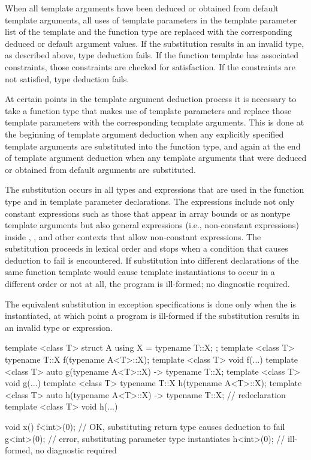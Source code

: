 When all template arguments have been deduced or obtained from
default template arguments, all uses of template parameters in
the template parameter list of the template and the function type
are replaced with the corresponding deduced
or default argument values. If the substitution results in an
invalid type, as described above, type deduction fails.
If the function template has associated constraints,
those constraints are checked for satisfaction.
If the constraints are not satisfied, type deduction fails.

\pnum
At certain points in the template argument deduction process it is necessary
to take a function type that makes use of template parameters and replace those
template parameters with the corresponding template arguments. This is done at
the beginning of template argument deduction when any explicitly specified
template arguments are substituted into the function type, and again at the end
of template argument deduction when any template arguments that were deduced or
obtained from default arguments are substituted.

\pnum
The substitution occurs in all types and expressions that are used in the function
type and in template parameter declarations. The expressions include not only
constant expressions such as those that appear in array bounds or as nontype
template arguments but also general expressions (i.e., non-constant expressions)
inside , , and other contexts that allow non-constant
expressions. The substitution proceeds in lexical order and stops when
a condition that causes deduction to fail is encountered.
If substitution into different declarations of the same function template would
cause template instantiations to occur in a different order or not at all,
the program is ill-formed; no diagnostic required.
\begin{note}
The equivalent substitution in exception specifications is
done only when the  is instantiated,
at which point a program is ill-formed
if the substitution results in an invalid type or expression.
\end{note}
\begin{example}
\begin{codeblock}
template <class T> struct A { using X = typename T::X; };
template <class T> typename T::X f(typename A<T>::X);
template <class T> void f(...) { }
template <class T> auto g(typename A<T>::X) -> typename T::X;
template <class T> void g(...) { }
template <class T> typename T::X h(typename A<T>::X);
template <class T> auto h(typename A<T>::X) -> typename T::X;   // redeclaration
template <class T> void h(...) { }

void x() {
  f<int>(0);        // OK, substituting return type causes deduction to fail
  g<int>(0);        // error, substituting parameter type instantiates 
  h<int>(0);        // ill-formed, no diagnostic required
}
\end{codeblock}
\end{example}

